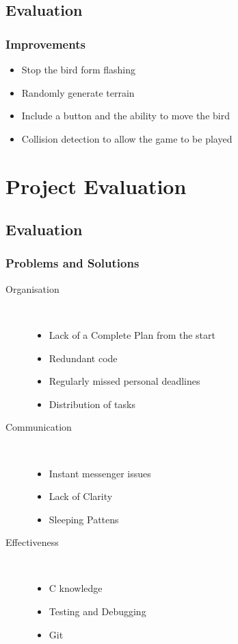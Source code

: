 \documentclass{beamer}
\begin{document}
\subsection{Evaluation}

\begin{frame}
\frametitle{Improvements}
\begin{itemize}
\item Stop the bird form flashing
\item Randomly generate terrain
\item Include a button and the ability to move the bird
\item Collision detection to allow the game to be played
\end{itemize}



\end{frame}


\section{Project Evaluation}
\subsection{Evaluation}
\begin{frame}

\frametitle{Problems and Solutions}

\begin{description}

\item[Organisation]\hfill\\
	\begin{itemize}
	\item Lack of a Complete Plan from the start
	\item Redundant code
	\item Regularly missed personal deadlines
	\item Distribution of tasks
	\end{itemize}

\item[Communication]\hfill\\
	\begin{itemize}
	\item Instant messenger issues
	\item Lack of Clarity
	\item Sleeping Pattens
	\end{itemize}

\item[Effectiveness]\hfill\\
	\begin{itemize}
	\item C knowledge
	\item Testing and Debugging
	\item Git
	\end{itemize}


\end{description}
\end{frame}
\end{document}
